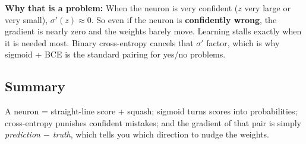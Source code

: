 \textbf{Why that is a problem:} When the neuron is very confident ($z$ very large or very small), $\sigma'(z) \approx 0$. So even if the neuron is \textbf{confidently wrong}, the gradient is nearly zero and the weights barely move. Learning stalls exactly when it is needed most. Binary cross-entropy cancels that $\sigma'$ factor, which is why sigmoid + BCE is the standard pairing for yes/no problems.

\subsection*{Summary}

A neuron = straight-line score + squash; sigmoid turns scores into probabilities; cross-entropy punishes confident mistakes; and the gradient of that pair is simply \emph{prediction $-$ truth}, which tells you which direction to nudge the weights.